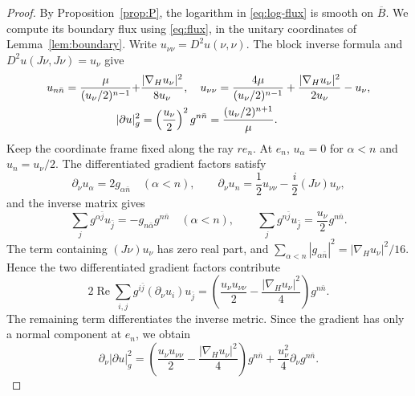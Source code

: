 \documentclass[11pt]{article}
\begin{document}
\begin{proof}
By Proposition~\ref{prop:P}, the logarithm in \eqref{eq:log-flux}
is smooth on $\overline B$. We compute its boundary flux using
\eqref{eq:flux}, in the unitary coordinates of
Lemma~\ref{lem:boundary}. Write $u_{\nu\nu}=D^2u(\nu,\nu)$.
The block inverse formula and $D^2u(J\nu,J\nu)=u_\nu$ give
\begin{align}
 u_{n\bar n}
 =\frac{\mu}{(u_\nu/2)^{n-1}}
   +&\frac{|\nabla_Hu_\nu|^2}{8u_\nu},\quad
 u_{\nu\nu}
 =\frac{4\mu}{(u_\nu/2)^{n-1}}
   +\frac{|\nabla_Hu_\nu|^2}{2u_\nu}-u_\nu,\notag\\
 |\partial u|_g^2
 &=\left(\frac{u_\nu}{2}\right)^2g^{n\bar n}
   =\frac{(u_\nu/2)^{n+1}}{\mu}.\label{eq:schur}
\end{align}
Keep the coordinate frame fixed along the ray $re_n$.
At $e_n$, $u_\alpha=0$ for $\alpha<n$ and $u_n=u_\nu/2$.
The differentiated gradient factors satisfy
$$
 \partial_\nu u_\alpha=2g_{\alpha\bar n}\quad(\alpha<n),\qquad
 \partial_\nu u_n=\frac12u_{\nu\nu}-\frac i2(J\nu)u_\nu,
$$
and the inverse matrix gives
$$
 \sum_jg^{\alpha\bar j}u_{\bar j}
 =-g_{n\bar\alpha}g^{n\bar n}\quad(\alpha<n),\qquad
 \sum_jg^{n\bar j}u_{\bar j}=
 \frac{u_\nu}{2}g^{n\bar n}.
$$
The term containing $(J\nu)u_\nu$ has zero real part, and
$\sum_{\alpha<n}|g_{\alpha\bar n}|^2
=|\nabla_Hu_\nu|^2/16$. Hence the two differentiated gradient
factors contribute
$$
 2\operatorname{Re}\sum_{i,j}
 g^{i\bar j}(\partial_\nu u_i)u_{\bar j}
 =\left(\frac{u_\nu u_{\nu\nu}}2
       -\frac{|\nabla_Hu_\nu|^2}{4}\right)g^{n\bar n}.
$$
The remaining term differentiates the inverse metric. Since the
gradient has only a normal component at $e_n$, we obtain
\begin{equation}\label{eq:qnu-first}
 \partial_\nu|\partial u|_g^2
 =\left(\frac{u_\nu u_{\nu\nu}}2
       -\frac{|\nabla_Hu_\nu|^2}{4}\right)g^{n\bar n}
       +\frac{u_\nu^2}{4}\partial_\nu g^{n\bar n}.
\end{equation}


\end{proof}
\end{document}
